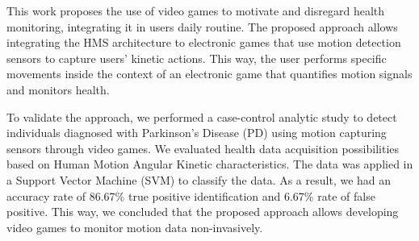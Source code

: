 This work proposes the use of video games to motivate and disregard health monitoring, integrating it in users daily routine. The proposed approach allows integrating the HMS architecture to electronic games that use motion detection sensors to capture users' kinetic actions. This way, the user performs specific movements inside the context of an electronic game that quantifies motion signals and monitors health.

To validate the approach, we performed a case-control analytic study to detect individuals diagnosed with Parkinson's Disease (PD) using motion capturing sensors through video games. We evaluated health data acquisition possibilities based on Human Motion Angular Kinetic characteristics. The data was applied in a Support Vector Machine (SVM) to classify the data. As a result, we had an accuracy rate of 86.67\% true positive identification and 6.67\% rate of false positive. This way, we concluded that the proposed approach allows developing video games to monitor motion data non-invasively.